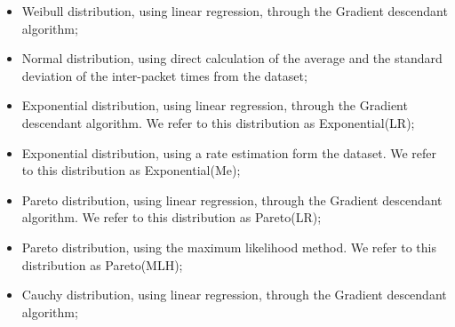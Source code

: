 \begin{itemize}
    \item Weibull distribution, using linear regression, through the Gradient descendant algorithm;
    \item Normal distribution, using direct calculation of the average and the standard deviation of the inter-packet times from the dataset;
    \item Exponential distribution, using linear regression, through the Gradient descendant algorithm. We refer to this distribution as Exponential(LR);
    \item Exponential distribution, using a rate estimation form the dataset. We refer to this distribution as Exponential(Me);
    \item Pareto distribution, using linear regression, through the Gradient descendant algorithm. We refer to this distribution as Pareto(LR);
    \item Pareto distribution, using the maximum likelihood method. We refer to this distribution as Pareto(MLH);
    \item Cauchy distribution, using linear regression, through the Gradient descendant algorithm;
\end{itemize}



